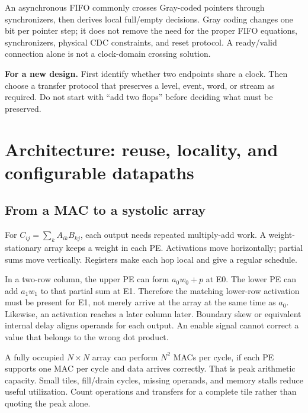 \documentclass[11pt]{article}
\newcommand{\transfer}[1]{\par\textbf{For a new design.} #1\par}
\begin{document}
An asynchronous FIFO commonly crosses Gray-coded pointers through synchronizers, then derives local full/empty decisions.
Gray coding changes one bit per pointer step; it does not remove the need for the proper FIFO equations, synchronizers, physical CDC constraints, and reset protocol.
A ready/valid connection alone is not a clock-domain crossing solution.
\transfer{First identify whether two endpoints share a clock. Then choose a transfer protocol that preserves a level, event, word, or stream as required.
Do not start with ``add two flops'' before deciding what must be preserved.}

\section{Architecture: reuse, locality, and configurable datapaths}\label{sec:architecture}
\subsection{From a MAC to a systolic array}
For \(C_{ij}=\sum_k A_{ik}B_{kj}\), each output needs repeated multiply-add work.
A weight-stationary array keeps a weight in each PE. Activations move horizontally; partial sums move vertically.
Registers make each hop local and give a regular schedule.

In a two-row column, the upper PE can form \(a_0w_0+p\) at E0.
The lower PE can add \(a_1w_1\) to that partial sum at E1.
Therefore the matching lower-row activation must be present for E1, not merely arrive at the array at the same time as \(a_0\).
Likewise, an activation reaches a later column later. Boundary skew or equivalent internal delay aligns operands for each output.
An enable signal cannot correct a value that belongs to the wrong dot product.

\begin{center}
\end{center}
A fully occupied \(N\times N\) array can perform \(N^2\) MACs per cycle, if each PE supports one MAC per cycle and data arrives correctly.
That is peak arithmetic capacity. Small tiles, fill/drain cycles, missing operands, and memory stalls reduce useful utilization.
Count operations and transfers for a complete tile rather than quoting the peak alone.
\end{document}
